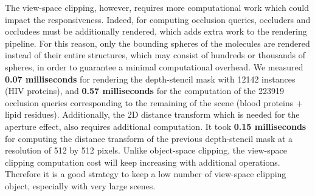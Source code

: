 The view-space clipping, however, requires more computational work which could impact the responsiveness. 
Indeed, for computing occlusion queries, occluders and occludees must be additionally rendered, which adds extra work to the rendering pipeline. 
For this reason, only the bounding spheres of the molecules are rendered instead of their entire structures, which may consist of hundreds or thousands of spheres, in order to guarantee a minimal computational overhead. 
We measured \textbf{0.07 milliseconds} for rendering the depth-stencil mask with 12142 instances (HIV proteins), and \textbf{0.57 milliseconds} for the computation of the 223919 occlusion queries corresponding to the remaining of the scene (blood proteins + lipid residues).
Additionally, the 2D distance transform which is needed for the aperture effect, also requires additional computation.
It took \textbf{0.15 milliseconds} for computing the distance transform of the previous depth-stencil mask at a resolution of 512 by 512 pixels.
Unlike object-space clipping, the view-space clipping computation cost will keep increasing with additional operations.
Therefore it is a good strategy to keep a low number of view-space clipping object, especially with very large scenes.







